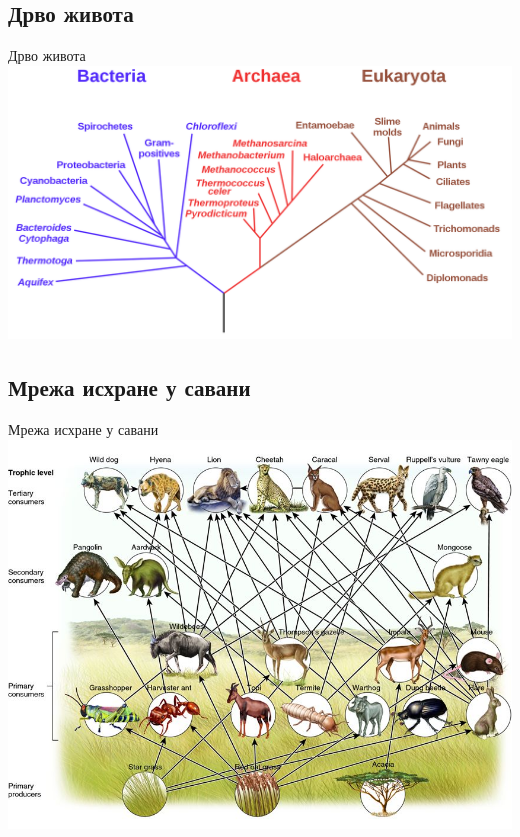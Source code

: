 \documentclass[hyperref={bookmarks=false}]{beamer}
\begin{document}
\subsection{Дрво живота}
\begin{frame}{Дрво живота}
\centering\includegraphics[width=.95\textwidth]{drvo_zivota.png}
\end{frame}

\subsection{Мрежа исхране у савани}
\begin{frame}{Мрежа исхране у савани}
\centering\includegraphics[width=.8\textwidth]{savana.jpeg}
\end{frame}
\end{document}
